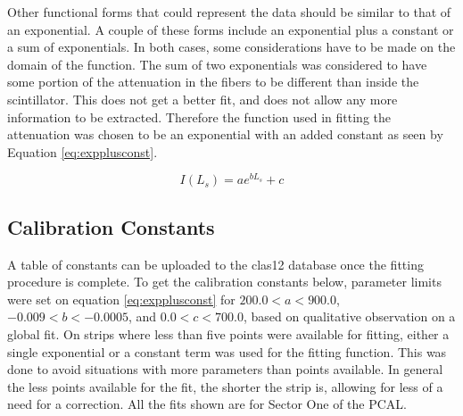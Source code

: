 \begin{comment}
\begin{equation}
    I(L_{s})= ae^{(b_{1} + b_{2})L_{s} + b_{1}L_{f}}
    \label{eq:try1mid}
\end{equation}

\FloatBarrier
\begin{figure}[h]
    \centering
    \texttt{[image: exponential67eq9]}
    \caption{Plotted is the fit of equation \ref{eq:try1mid} as a function of $L_{s}$.}
    \label{fig:try1mid}
\end{figure}
\end{comment}
\FloatBarrier


Other functional forms that could represent the data should be similar to that of an exponential.
A couple of these forms include an exponential plus a constant or a sum of exponentials.
In both cases, some considerations have to be made on the domain of the function.
The sum of two exponentials was considered to have some portion of the attenuation in the fibers to 
be different than inside the scintillator. This does not get a better fit, and does not allow any more 
information to be extracted. Therefore the function used in fitting the attenuation was chosen to be 
an exponential with an added constant as seen by Equation \ref{eq:expplusconst}.

\begin{equation}
    I(L_{s}) = ae^{bL_{s}}+c
    \label{eq:expplusconst}
\end{equation}


\FloatBarrier
\subsection{Calibration Constants}
A table of constants can be uploaded to the clas12 database once the fitting procedure is complete.
To get the calibration constants below, parameter limits were set on equation \ref{eq:expplusconst} 
for $200.0 < a < 900.0$, $-0.009 < b < -0.0005$, and $0.0 < c < 700.0$, based on qualitative 
observation on a global fit. On strips where less than five points were available for fitting, either 
a single exponential or a constant term was used for the fitting function. This was done to avoid situations 
with more parameters than points available. In general the less points available for the fit, the shorter 
the strip is, allowing for less of a need for a correction. All the fits shown are for Sector One of the PCAL.
\FloatBarrier
\vspace{5mm}

